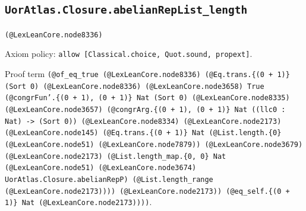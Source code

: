 \documentclass[11pt]{article}
\begin{document}
\subsection*{\texttt{UorAtlas.Closure.abelianRepList\_length}}
\noindent\texttt{(@LexLeanCore.node8336)}\par
\noindent Axiom policy: \texttt{allow [Classical.choice, Quot.sound, propext]}.\par
\noindent Proof term \texttt{(@of\_eq\_true (@LexLeanCore.node8336) (@Eq.trans.\{(0 + 1)\} (Sort 0) (@LexLeanCore.node8336) (@LexLeanCore.node3658) True (@congrFun'.\{(0 + 1), (0 + 1)\} Nat (Sort 0) (@LexLeanCore.node8335) (@LexLeanCore.node3657) (@congrArg.\{(0 + 1), (0 + 1)\} Nat ((llc0 : Nat) -> (Sort 0)) (@LexLeanCore.node8334) (@LexLeanCore.node2173) (@LexLeanCore.node145) (@Eq.trans.\{(0 + 1)\} Nat (@List.length.\{0\} (@LexLeanCore.node51) (@LexLeanCore.node7879)) (@LexLeanCore.node3679) (@LexLeanCore.node2173) (@List.length\_map.\{0, 0\} Nat (@LexLeanCore.node51) (@LexLeanCore.node3674) UorAtlas.Closure.abelianRepP) (@List.length\_range (@LexLeanCore.node2173)))) (@LexLeanCore.node2173)) (@eq\_self.\{(0 + 1)\} Nat (@LexLeanCore.node2173))))}.\par
\end{document}
